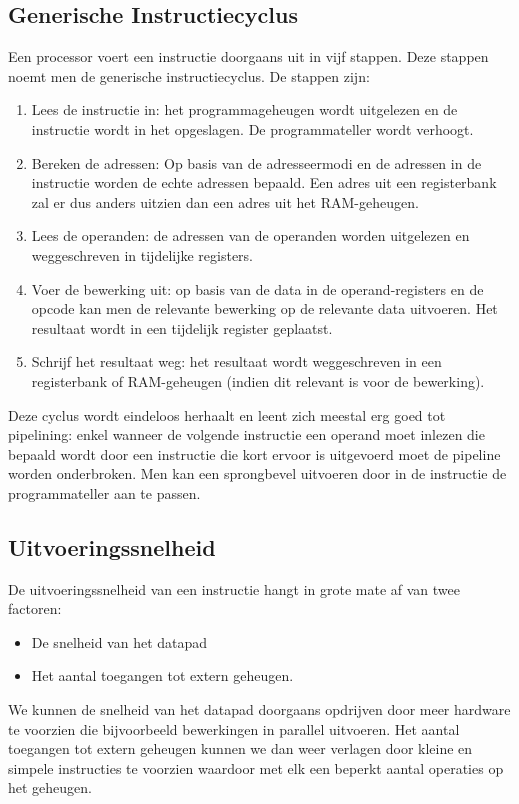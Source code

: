 \subsection{Generische Instructiecyclus}
Een processor voert een instructie doorgaans uit in vijf stappen. Deze stappen noemt men de generische instructiecyclus. De stappen zijn:
\begin{enumerate}
 \item Lees de instructie in: het programmageheugen wordt uitgelezen en de instructie wordt in het  opgeslagen. De programmateller wordt verhoogt.
 \item Bereken de adressen: Op basis van de adresseermodi en de adressen in de instructie worden de echte adressen bepaald. Een adres uit een registerbank zal er dus anders uitzien dan een adres uit het RAM-geheugen.
 \item Lees de operanden: de adressen van de operanden worden uitgelezen en weggeschreven in tijdelijke registers.
 \item Voer de bewerking uit: op basis van de data in de operand-registers en de opcode kan men de relevante bewerking op de relevante data uitvoeren. Het resultaat wordt in een tijdelijk register geplaatst.
 \item Schrijf het resultaat weg: het resultaat wordt weggeschreven in een registerbank of RAM-geheugen (indien dit relevant is voor de bewerking).
\end{enumerate}
Deze cyclus wordt eindeloos herhaalt en leent zich meestal erg goed tot pipelining: enkel wanneer de volgende instructie een operand moet inlezen die bepaald wordt door een instructie die kort ervoor is uitgevoerd moet de pipeline worden onderbroken. Men kan een sprongbevel uitvoeren door in de instructie de programmateller aan te passen.
\subsection{Uitvoeringssnelheid}
De uitvoeringssnelheid van een instructie hangt in grote mate af van twee factoren:
\begin{itemize}
 \item De snelheid van het datapad
 \item Het aantal toegangen tot extern geheugen.
\end{itemize}
We kunnen de snelheid van het datapad doorgaans opdrijven door meer hardware te voorzien die bijvoorbeeld bewerkingen in parallel uitvoeren. Het aantal toegangen tot extern geheugen kunnen we dan weer verlagen door kleine en simpele instructies te voorzien waardoor met elk een beperkt aantal operaties op het geheugen.
